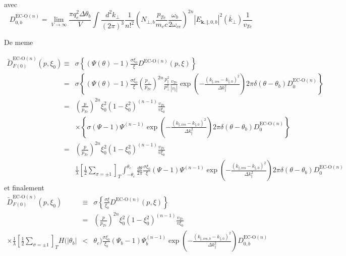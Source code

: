  avec \[
D_{0,b}^{\text{EC-O}(n)}=\lim_{V\rightarrow\infty}\frac{\pi q_{e}^{2}\Delta\theta_{b}}{V}\int\frac{d^{2}k_{\bot}}{(2\pi)^{3}}\frac{1}{n!^{2}}\left(N_{\bot,b}\frac{p_{Te}}{m_{e}c}\frac{\omega_{b}}{2\omega_{ce}}\right)^{2n}\left|E_{\mathbf{k},\Vert,0,b}\right|^{2}(\overline{k}_{\bot})\frac{1}{v_{Te}}\]


De meme

\begin{eqnarray*}
\widetilde{D}_{F(0)}^{\text{EC-O}(n)}(p,\xi_{0}) & \equiv & \sigma\left\{ \left(\Psi(\theta)-1\right)\frac{\sigma\xi_{0}}{\xi}D^{\text{EC-O}(n)}(p,\xi)\right\} \\
 & = & \sigma\left\{ \left(\Psi(\theta)-1\right)\frac{\sigma\xi_{0}}{\xi}\left(\frac{p_{\bot}}{p_{Te}}\right)^{2n}\frac{p_{\Vert}^{2}}{p_{\bot}^{2}}\frac{v_{Te}}{\left|v_{\Vert}\right|}\exp\left(-\frac{\left(k_{\Vert,\text{res}}-k_{\Vert,0}\right)^{2}}{\Delta k_{\Vert}^{2}}\right)2\pi\delta(\theta-\theta_{b})D_{0}^{\text{EC-O}(n)}\right\} \\
 & = & \left(\frac{p}{p_{Te}}\right)^{2n}\xi_{0}^{2}\left(1-\xi_{0}^{2}\right)^{(n-1)}\frac{v_{Te}}{v\xi_{0}}\\
 &  & \times\left\{ \sigma\left(\Psi-1\right)\Psi^{(n-1)}\exp\left(-\frac{\left(k_{\Vert,\text{res}}-k_{\Vert,0}\right)^{2}}{\Delta k_{\Vert}^{2}}\right)2\pi\delta(\theta-\theta_{b})D_{0}^{\text{EC-O}(n)}\right\} \\
 & = & \left(\frac{p}{p_{Te}}\right)^{2n}\xi_{0}^{2}\left(1-\xi_{0}^{2}\right)^{(n-1)}\frac{v_{Te}}{v\xi_{0}}\\
 &  & \frac{1}{\lambda}\left[\frac{1}{2}\sum_{\sigma=\pm1}\right]_{T}\int_{-\theta_{c}}^{\theta_{c}}\frac{d\theta}{2\pi}\frac{\sigma\xi_{0}}{\xi}\left(\Psi-1\right)\Psi^{(n-1)}\exp\left(-\frac{\left(k_{\Vert,\text{res}}-k_{\Vert,0}\right)^{2}}{\Delta k_{\Vert}^{2}}\right)2\pi\delta(\theta-\theta_{b})D_{0}^{\text{EC-O}(n)}\end{eqnarray*}
 et finalement \begin{eqnarray*}
\widetilde{D}_{F(0)}^{\text{EC-O}(n)}(p,\xi_{0}) & \equiv & \sigma\left\{ \frac{\sigma\xi}{\xi_{0}}D^{\text{EC-O}(n)}(p,\xi)\right\} \\
 & = & \left(\frac{p}{p_{Te}}\right)^{2n}\xi_{0}^{2}\left(1-\xi_{0}^{2}\right)^{(n-1)}\frac{v_{Te}}{v\xi_{0}}\\
\times\frac{1}{\lambda}\left[\frac{1}{2}\sum_{\sigma=\pm1}\right]_{T}H(|\theta_{b}| & < & \theta_{c})\frac{\sigma\xi_{0}}{\xi_{b}}\left(\Psi_{b}-1\right)\Psi_{b}^{(n-1)}\exp\left(-\frac{\left(k_{\Vert,\text{res},b}-k_{\Vert,0}\right)^{2}}{\Delta k_{\Vert}^{2}}\right)D_{0,b}^{\text{EC-O}(n)}\end{eqnarray*}

